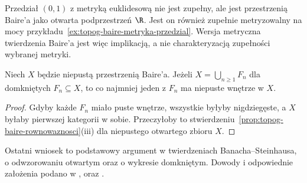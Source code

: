 \begin{uwaga}
Przedział $(0,1)$ z metryką euklidesową
nie jest zupełny, ale jest przestrzenią Baire'a
jako otwarta podprzestrzeń $\R$.
Jest on również zupełnie metryzowalny
na mocy przykładu~\ref{ex:topog-baire-metryka-przedzial}.
Wersja metryczna twierdzenia Baire'a
jest więc implikacją, a nie charakteryzacją
zupełności wybranej metryki.
\end{uwaga}

\begin{wniosek}
\label{cor:topog-baire-domkniete}
Niech $X$ będzie niepustą przestrzenią Baire'a.
Jeżeli $X=\bigcup_{n\ge1}F_n$ dla domkniętych
$F_n\subseteq X$, to co najmniej jeden
z $F_n$ ma niepuste wnętrze w $X$.
\end{wniosek}
\begin{proof}
Gdyby każde $F_n$ miało puste wnętrze,
wszystkie byłyby nigdziegęste,
a $X$ byłaby pierwszej kategorii w sobie.
Przeczyłoby to
stwierdzeniu~\ref{prop:topog-baire-rownowaznosci}(iii)
dla niepustego otwartego zbioru $X$.
\end{proof}

\begin{uwaga}
Ostatni wniosek to podstawowy argument
w twierdzeniach Banacha--Steinhausa,
o odwzorowaniu otwartym oraz o wykresie domkniętym.
Dowody i odpowiednie założenia podano w ,
 oraz
.
\end{uwaga}
